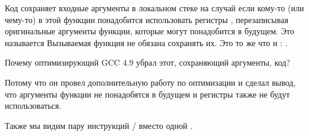 Код сохраняет входные аргументы в локальном стеке на случай если кому-то (или чему-то) в этой функции
понадобится использовать регистры , перезаписывая оригинальные аргументы функции, которые
могут понадобится в будущем.
Это называется  \cite{ARM64_PCS}
Вызываемая функция не обязана сохранять их.
Это то же что и : .

Почему оптимизирующий GCC 4.9 убрал этот, сохраняющий аргументы, код?

Потому что он провел дополнительную работу по оптимизации и сделал вывод, 
что аргументы функции не понадобятся в будущем и регистры  также не будут использоваться.

Также мы видим пару инструкций / вместо одной .


